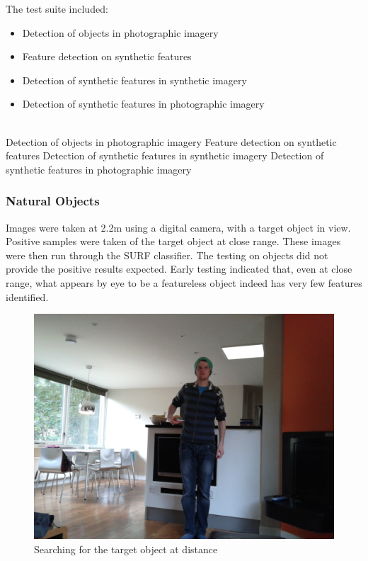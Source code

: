 The test suite included:
\begin{itemize}
\item Detection of objects in photographic imagery
\item Feature detection on synthetic features
\item Detection of synthetic features in synthetic imagery
\item Detection of synthetic features in photographic imagery
\end{itemize}
\\
Detection of objects in photographic imagery
Feature detection on synthetic features
Detection of synthetic features in synthetic imagery
Detection of synthetic features in photographic imagery
\\
\subsubsection{Natural Objects}
Images were taken at 2.2m using a digital camera, with a target object in view. Positive samples were taken of the target object at close range. These images were then run through the SURF classifier.
The testing on objects did not provide the positive results expected. Early testing indicated that, even at close range, what appears by eye to be a featureless object indeed has very few features identified.\\

\begin{figure}
\begin{center}
\includegraphics[scale=0.18]{images/20130207_134914.jpg}
\caption{Searching for the target object at distance}
\end{center}
\end{figure}

